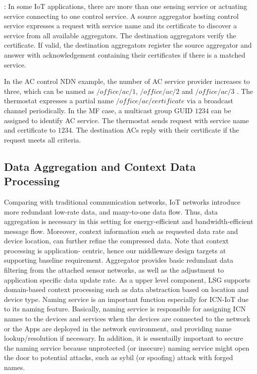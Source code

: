 \vspace{1mm}: In some IoT applications, there are more than one sensing service or actuating service connecting to one control service. A source aggregator hosting control service expresses a request with service name and its certificate to discover a service from all  available aggregators. The destination aggregators verify the certificate. If valid, the destination aggregators register the source aggregator and  answer with acknowledgement containing their certificates if there is a matched service.

In the AC control NDN example, the number of AC service provider increases to three, which can be named as $/office/ac/1$, $/office/ac/2$ and $/office/ac/3$ . The thermostat expresses a partial name $/office/ac/certificate$ via a broadcast channel periodically. In the MF case, a multicast group GUID $1234$ can be assigned to identify AC service. The thermostat sends request with service name and certificate to $1234$. The destination ACs reply with their certificate if the request meets all criteria.
\subsection{Data Aggregation and Context Data Processing}
Comparing with traditional communication networks, IoT networks introduce more redundant low-rate data, and many-to-one data flow. Thus, data aggregation is necessary in this setting for energy-efficient and bandwidth-efficient message flow. Moreover, context information such as requested data rate and device location, can further refine the compressed data. Note that context processing is application- centric, hence our middleware design targets at supporting baseline requirement. Aggregator provides basic redundant data filtering from the attached sensor networks, as well as the adjustment to application specific data update rate. As a upper level component, LSG supports domain-based context processing such as data abstraction based on location and device type.  
Naming service is an important function especially for ICN-IoT due to its naming feature. Basically, naming service is responsible for assigning ICN names to the devices and services when the devices are connected to the network or the Apps are deployed in the network environment, and providing name lookup/resolution if necessary. In addition, it is essentailly important to secure the naming service because unprotected (or insecure) naming service might open the door to potential attacks, such as sybil (or spoofing) attack \cite{sybil} with forged names.
 

